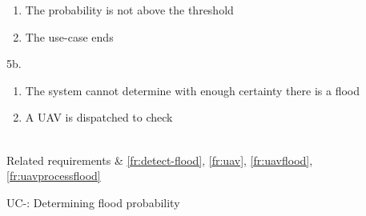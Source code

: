 \begin{table}[H]
{{		\begin{enumerate}
		  \item The probability is not above the threshold
		  \item The use-case ends
		\end{enumerate}
		\item[5b.]
		\begin{enumerate}
		  \item The system cannot determine with enough certainty there is a flood
		  \item A UAV is dispatched to check
		\end{enumerate}
		}\\
	Related requirements & \ref{fr:detect-flood}, \ref{fr:uav}, \ref{fr:uavflood}, \ref{fr:uavprocessflood} \\
}
\caption{UC-: Determining flood probability}
\label{table:uc-determine-flood-probability}
\end{table}

\clearpage
